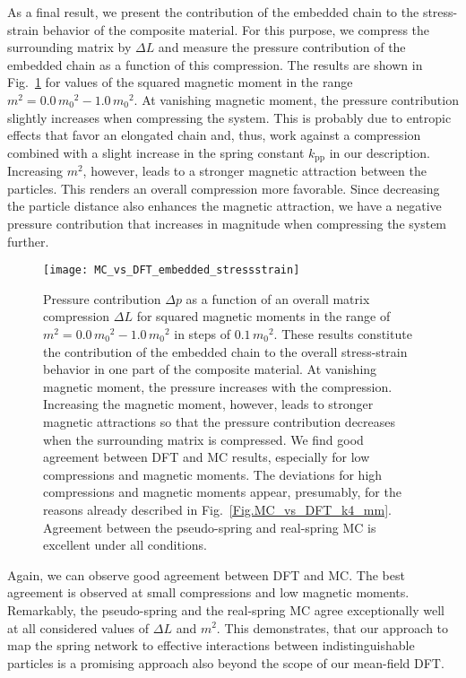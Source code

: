 \documentclass[aps,pre,twocolumn,superscriptaddress,nofootinbib]{revtex4}
\begin{document}
As a final result, we present the contribution of the embedded chain to the stress-strain behavior of the composite material. 
For this purpose, we compress the surrounding matrix by $\Delta L$ and measure the pressure contribution of the embedded chain as a function of this compression. 
The results are shown in Fig.~\ref{Fig.MC_vs_DFT_embedded_stressstrain} for values of the squared magnetic moment in the range $m^2  = 0.0\,{m_0}^2 - 1.0\,{m_0}^2$. 
At vanishing magnetic moment, the pressure contribution slightly increases when compressing the system. 
This is  probably due to entropic effects that favor an elongated chain and, thus, work against a compression combined with a slight increase in the spring constant $k_\textrm{pp}$ in our description. 
Increasing $m^2$, however, leads to a stronger magnetic attraction between the particles. 
This renders an overall compression more favorable. 
Since decreasing the particle distance also enhances the magnetic attraction, we have a negative pressure contribution that increases in magnitude when compressing the system further.

%
\begin{figure}[b]
	\texttt{[image: MC\_vs\_DFT\_embedded\_stressstrain]}
	\caption{Pressure contribution $\Delta p$ as a function of an overall matrix compression $\Delta L$ for squared magnetic moments in the range of $m^2  = 0.0\,{m_0}^2 - 1.0\,{m_0}^2$ in steps of $0.1\,{m_0}^2$. These results constitute the contribution of the embedded chain to the overall stress-strain behavior in one part of the composite material. At vanishing magnetic moment, the pressure increases with the compression. Increasing the magnetic moment, however, leads to stronger magnetic attractions so that the pressure contribution decreases when the surrounding matrix is compressed. We find good agreement between DFT and MC results, especially for low compressions and magnetic moments. The deviations for high compressions and magnetic moments appear, presumably, for the reasons already described in Fig.~\ref{Fig.MC_vs_DFT_k4_mm}. Agreement between the pseudo-spring and real-spring MC is excellent under all conditions.}
	\label{Fig.MC_vs_DFT_embedded_stressstrain}
\end{figure}
%

Again, we can observe good agreement between DFT and MC. 
The best agreement is observed at small compressions and low magnetic moments. 
Remarkably, the pseudo-spring and the real-spring MC agree exceptionally well at all considered values of $\Delta L$ and $m^2$. 
This demonstrates, that our approach to map the spring network to effective interactions between indistinguishable particles is a promising approach also beyond the scope of our mean-field DFT. 
\end{document}
